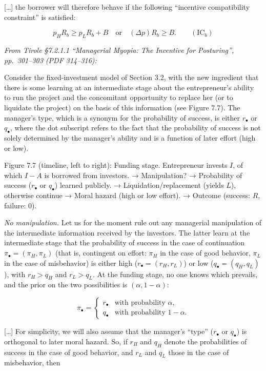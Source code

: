 \documentclass[11pt,a4paper]{article}
\begin{document}
{[}\ldots{]} the borrower will therefore behave if the following ``incentive compatibility
constraint'' is satisfied:

\[p_H R_b \geqslant p_L R_b + B \quad \text{or} \quad (\Delta p) R_b \geqslant B. \qquad (\text{IC}_b)\]

\emph{From Tirole §7.2.1.1 ``Managerial Myopia: The Incentive for Posturing'', pp.~301--303 (PDF
314--316):}

Consider the fixed-investment model of Section 3.2, with the new ingredient that there is some
learning at an intermediate stage about the entrepreneur's ability to run the project and the
concomitant opportunity to replace her (or to liquidate the project) on the basis of this
information (see Figure 7.7). The manager's type, which is a synonym for the probability of success,
is either \(r_\bullet\) or \(q_\bullet\), where the dot subscript refers to the fact that the
probability of success is not solely determined by the manager's ability and is a function of later
effort (high or low).

Figure 7.7 (timeline, left to right): Funding stage. Entrepreneur invests \(I\), of which \(I - A\)
is borrowed from investors. → Manipulation? → Probability of success (\(r_\bullet\) or
\(q_\bullet\)) learned publicly. → Liquidation/replacement (yields \(L\)), otherwise continue →
Moral hazard (high or low effort). → Outcome (success: \(R\), failure: 0).

\emph{No manipulation.} Let us for the moment rule out any managerial manipulation of the
intermediate information received by the investors. The latter learn at the intermediate stage that
the probability of success in the case of continuation \(\pi_\bullet = (\pi_H, \pi_L)\) (that is,
contingent on effort: \(\pi_H\) in the case of good behavior, \(\pi_L\) in the case of misbehavior)
is either high (\(r_\bullet = (r_H, r_L)\)) or low (\(q_\bullet = (q_H, q_L)\)), with \(r_H > q_H\)
and \(r_L > q_L\). At the funding stage, no one knows which prevails, and the prior on the two
possibilities is \((\alpha, 1 - \alpha)\):

\[\pi_\bullet = \begin{cases} r_\bullet & \text{with probability } \alpha, \\ q_\bullet & \text{with probability } 1 - \alpha. \end{cases}\]

{[}\ldots{]} For simplicity, we will also assume that the manager's ``type'' (\(r_\bullet\) or
\(q_\bullet\)) is orthogonal to later moral hazard. So, if \(r_H\) and \(q_H\) denote the
probabilities of success in the case of good behavior, and \(r_L\) and \(q_L\) those in the case of
misbehavior, then
\end{document}
